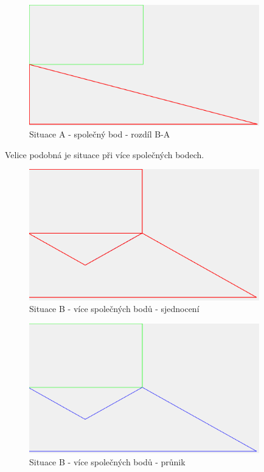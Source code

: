 \documentclass[a4paper,11pt,twoside]{article}
\begin{document}
\vspace{0.2cm}
\begin{figure}[hbt!] 
\begin{center}
\includegraphics[width=10cm]{pictures/A_diffBA.png} 
\caption[Situace A - společný bod - rozdíl B-A]{Situace A - společný bod - rozdíl B-A}
\label{fig:A_diffBA}
\end{center}
\end{figure}

Velice podobná je situace při více společných bodech. 

\vspace{0.2cm}
\begin{figure}[hbt!] 
\begin{center}
\includegraphics[width=10cm]{pictures/B_union.png} 
\caption[Situace B - více společných bodů - sjednocení]{Situace B - více společných bodů  - sjednocení}
\label{fig:B_union}
\end{center}
\end{figure}

\vspace{0.2cm}
\begin{figure}[hbt!] 
\begin{center}
\includegraphics[width=10cm]{pictures/B_intersect.png} 
\caption[Situace B - více společných bodů  - průnik]{Situace B - více společných bodů  - průnik}
\label{fig:B_intersect}
\end{center}
\end{figure}
\end{document}
